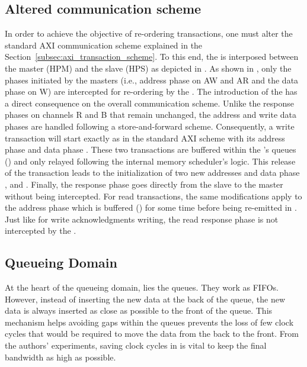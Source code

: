 \subsection{Altered communication scheme}\label{sec:communication-scheme}
In order to achieve the objective of re-ordering transactions, one
must alter the standard AXI communication scheme explained in the
Section~\ref{subsec:axi_transaction_scheme}.  To this end, the \schim
is interposed between the master (HPM) and the slave (HPS) as depicted
in . As shown in
, only the phases initiated
by the masters (i.e., address phase on AW and AR and the data phase on
W) are intercepted for re-ordering by the \schim.  The introduction of
the \schim has a direct consequence on the overall communication
scheme. Unlike the response phases on channels R and B that remain
unchanged, the address and write data phases are handled following a
store-and-forward scheme.  Consequently, a write transaction will
start exactly as in the standard AXI scheme with its address phase
 and data phase .  These two transactions are
buffered within the \schim's queues () and only relayed
following the internal memory scheduler's logic.  This release of the
transaction leads to the initialization of two new addresses and data
phase , and .  Finally, the response phase
 goes directly from the slave to the master without being
intercepted.  For read transactions, the same modifications apply to
the address phase  which is buffered () for
some time before being re-emitted in .  Just like for
write acknowledgments writing, the read response phase  is
not intercepted by the \schim.

%  

\subsection{Queueing Domain}
At the heart of the queueing domain, lies the queues. They work as FIFOs.
However, instead of inserting the new data at the back of the queue,
the new data is always inserted as close as possible to the front of the
queue. This mechanism helps avoiding gaps within the queues prevents the
loss of few clock cycles that would be required to move the data from
the back to the front. From the authors' experiments, saving clock cycles
in \schim is vital to keep the final bandwidth as high as possible.

